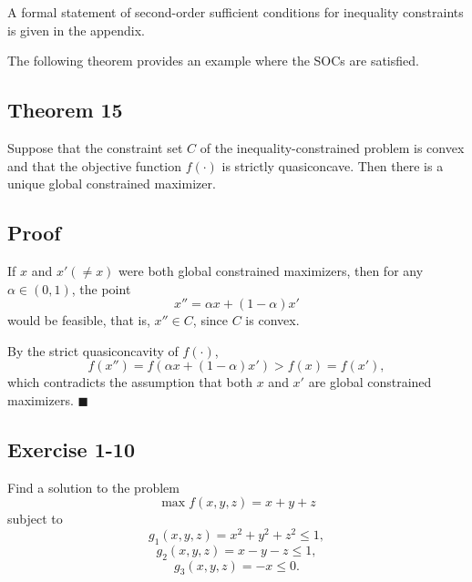 \vspace{1em}

A formal statement of second-order sufficient conditions for inequality
constraints is given in the appendix.

The following theorem provides an example where the SOCs are satisfied.



\begin{tcolorbox}[breakable, colback=white]
\subsection*{Theorem 15}

Suppose that the constraint set $C$ of the inequality-constrained problem
is convex and that the objective function $f(\cdot)$ is strictly quasiconcave.
Then there is a unique global constrained maximizer.


\subsection*{Proof}

If $x$ and $x' (\ne x)$ were both global constrained maximizers, then for any
$\alpha \in (0,1)$, the point
\[
x''=\alpha x+(1-\alpha)x'
\]
would be feasible, that is, $x'' \in C$, since $C$ is convex.

By the strict quasiconcavity of $f(\cdot)$,
\[
f(x'') = f(\alpha x+(1-\alpha)x') > f(x)=f(x'),
\]
which contradicts the assumption that both $x$ and $x'$ are global constrained maximizers.
\hfill $\blacksquare$

\end{tcolorbox}

\begin{tcolorbox}[breakable]

\subsection*{Exercise 1-10}

Find a solution to the problem
\[
\max f(x,y,z)=x+y+z
\]
subject to
\[
g_1(x,y,z)=x^2+y^2+z^2 \le 1,
\]
\[
g_2(x,y,z)=x-y-z \le 1,
\]
\[
g_3(x,y,z)=-x \le 0.
\]

\end{tcolorbox}



